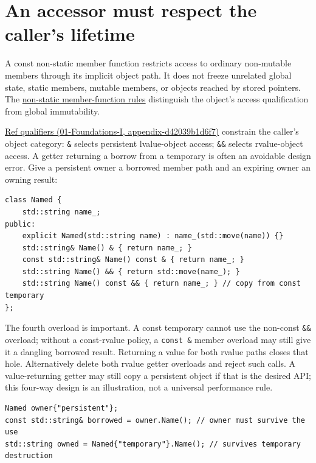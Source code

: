 \section{An accessor must respect the caller's lifetime}\label{05-engine-i-ch003-an-accessor-must-respect-the-callers-lifetime}

A const non-static member function restricts access to ordinary non-mutable members through its implicit object path. It does not freeze unrelated global state, static members, mutable members, or objects reached by stored pointers. The \href{https://eel.is/c++draft/class.mfct.non.static}{non-static member-function rules} distinguish the object's access qualification from global immutability.

\href{../01-Foundations-I/main.pdf\#nameddest=appendix-d42039b1d6f7}{Ref qualifiers (01-Foundations-I, appendix-d42039b1d6f7)} constrain the caller's object category: \texttt{\&} selects persistent lvalue-object access; \texttt{\&\&} selects rvalue-object access. A getter returning a borrow from a temporary is often an avoidable design error. Give a persistent owner a borrowed member path and an expiring owner an owning result:

\begin{verbatim}
class Named {
    std::string name_;
public:
    explicit Named(std::string name) : name_(std::move(name)) {}
    std::string& Name() & { return name_; }
    const std::string& Name() const & { return name_; }
    std::string Name() && { return std::move(name_); }
    std::string Name() const && { return name_; } // copy from const temporary
};
\end{verbatim}

The fourth overload is important. A const temporary cannot use the non-const \texttt{\&\&} overload; without a const-rvalue policy, a \texttt{const\ \&} member overload may still give it a dangling borrowed result. Returning a value for both rvalue paths closes that hole. Alternatively delete both rvalue getter overloads and reject such calls. A value-returning getter may still copy a persistent object if that is the desired API; this four-way design is an illustration, not a universal performance rule.

\begin{verbatim}
Named owner{"persistent"};
const std::string& borrowed = owner.Name(); // owner must survive the use
std::string owned = Named{"temporary"}.Name(); // survives temporary destruction
\end{verbatim}

